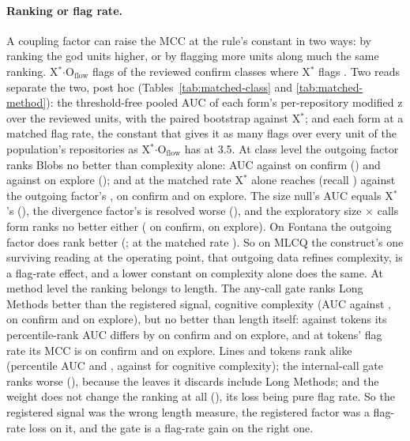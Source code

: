 \documentclass[11pt,a4paper]{article}
\newcommand{\Xs}{X$^*$}
\newcommand{\Oflow}{O$_{\text{flow}}$}
\begin{document}
\paragraph{Ranking or flag rate.} A coupling factor can raise the MCC at the
rule's constant in two ways: by ranking the god units higher, or by flagging
more units along much the same ranking. \Xs$\cdot$\Oflow{} flags
\matchedOOwnFlags{} of the reviewed confirm classes where \Xs{} flags
\matchedXOwnFlags{}. Two reads separate the two, post hoc
(Tables~\ref{tab:matched-class} and \ref{tab:matched-method}): the
threshold-free pooled AUC of each form's per-repository modified z over the
reviewed units, with the paired bootstrap against \Xs{}; and each form at a
matched flag rate, the constant that gives it as many flags over every unit
of the population's repositories as \Xs$\cdot$\Oflow{} has at 3.5. At class
level the outgoing factor ranks Blobs no better than complexity alone: AUC
\matchedOAucConfirm{} against \matchedXAucConfirm{} on confirm
(\matchedOAucVsXConfirm{}) and \matchedOAucExplore{} against
\matchedXAucExplore{} on explore (\matchedOAucVsXExplore{}); and at the
matched rate \Xs{} alone reaches \matchedXMatchedMcc{} (recall
\matchedXMatchedRecall{}) against the outgoing factor's \matchedOMcc{},
\matchedOVsXConfirm{} on confirm and \matchedOVsXExplore{} on explore. The
size null's AUC equals \Xs{}'s (\matchedNAucVsXConfirm{}), the divergence
factor's is resolved worse (\matchedDAucVsXConfirm{}), and the exploratory
size $\times$ calls form ranks no better either
(\matchedSizeCallsAucVsXConfirm{} on confirm,
\matchedSizeCallsAucVsXExplore{} on explore). On Fontana the outgoing factor
does rank better (\matchedFontanaOAucVsX{}; at the matched rate
\matchedFontanaOVsX{}). So on MLCQ the construct's one surviving reading at
the operating point, that outgoing data refines complexity, is a flag-rate
effect, and a lower constant on complexity alone does the same. At method level the ranking belongs to length. The any-call gate ranks
Long Methods better than the registered signal, cognitive complexity (AUC
\matchedGateAucConfirm{} against \matchedCogAucConfirm{},
\matchedGateAucVsXmConfirm{} on confirm and \matchedGateAucVsXmExplore{}
on explore), but no better than length itself: against tokens its
percentile-rank AUC differs by \matchedGatePctVsTokensConfirm{} on confirm
and \matchedGatePctVsTokensExplore{} on explore, and at tokens' flag rate
its MCC is \matchedGateMatchedVsTokensConfirm{} on confirm and
\matchedGateMatchedVsTokensExplore{} on explore. Lines and tokens rank
alike (percentile AUC \matchedLinesPctConfirm{} and
\matchedTokensPctConfirm{}, against \matchedCogPctConfirm{} for cognitive
complexity); the internal-call gate ranks worse
(\matchedIntGateAucVsXmConfirm{}), because the leaves it discards include
Long Methods; and the weight does not change the ranking at all
(\matchedWeightAucVsXmConfirm{}), its loss being pure flag rate. So the
registered signal was the wrong length measure, the registered factor was a
flag-rate loss on it, and the gate is a flag-rate gain on the right one.
\end{document}
